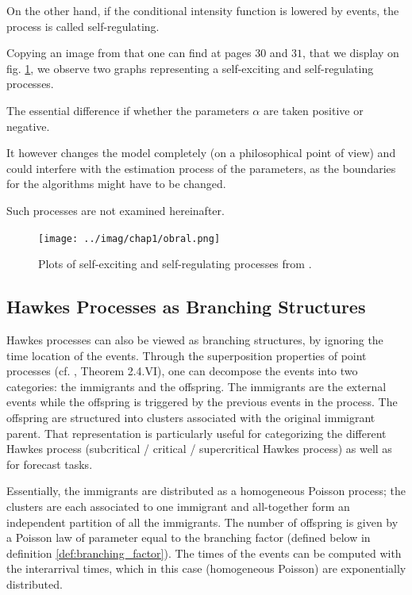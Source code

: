 \documentclass[11pt]{book}
\begin{document}
On the other hand, if the conditional intensity function is lowered by events, the process is called self-regulating. 

Copying an image from \cite{obral} that one can find at pages $30$ and $31$, that we display on fig. \ref{fig:obral}, we observe two graphs representing a self-exciting and self-regulating processes. 

The essential difference if whether the parameters $\alpha$ are taken positive or negative. 

It however changes the model completely (on a philosophical point of view) and could interfere with the estimation process of the parameters, as the boundaries for the algorithms might have to be changed.

Such processes are not examined hereinafter.

\begin{figure}
\centering
\texttt{[image: ../imag/chap1/obral.png]}
\caption{ Plots of self-exciting and self-regulating processes from \cite{obral}.}
\label{fig:obral}
\end{figure}












\subsection{Hawkes Processes as Branching Structures}
Hawkes processes can also be viewed as branching structures, by ignoring the time location of the events. Through the superposition
properties of point processes (cf. \cite{daley}, Theorem 2.4.VI), one can decompose the events into two categories: the immigrants and the offspring. The immigrants are the external events while the offspring is triggered by the previous events in the process. The offspring are structured into clusters associated with the original immigrant parent. That representation is particularly useful for categorizing the different Hawkes process (subcritical / critical / supercritical Hawkes process) as well as for forecast tasks.

Essentially, the immigrants are distributed as a homogeneous Poisson process; the clusters are each associated to one immigrant and all-together form an independent partition of all the immigrants. The number of offspring is given by a Poisson law of parameter equal to the branching factor (defined below in definition \ref{def:branching_factor}). The times of the events can be computed with the interarrival times, which in this case (homogeneous Poisson) are exponentially distributed.
\end{document}
